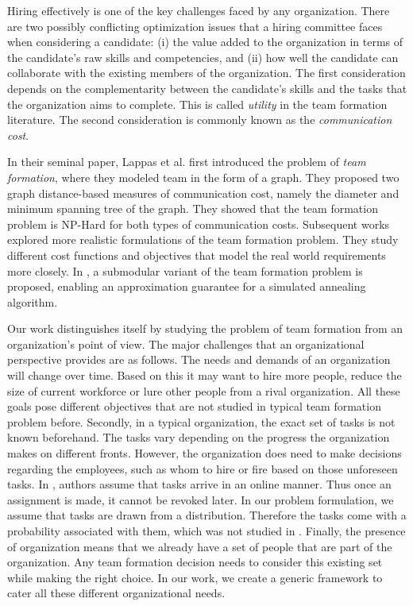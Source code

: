 Hiring effectively is one of the key challenges faced by any organization.
There are two possibly conflicting optimization issues that a hiring committee faces when considering a candidate: 
(i) the value added to the organization in terms of the candidate's raw skills and competencies, and 
(ii) how well the candidate can collaborate with the existing members of the organization.
The first consideration depends on the complementarity between the candidate's skills and the tasks that the organization aims to complete. 
This is called \textit{utility} in the team formation literature.
The second consideration is commonly known as the \textit{communication cost}.

In their seminal paper, Lappas et al. \cite{lappas2009finding} first introduced the problem of \textit{team formation}, where they modeled team in the form of a graph.
They proposed two graph distance-based measures of communication cost, namely the diameter and minimum spanning tree of the graph. 
They showed that the team formation problem is NP-Hard for both types of communication costs. 
Subsequent works  \cite{sozio2010community, kargar2011discovering, anagnostopoulos2010power, rangapuram2013towards} explored more realistic formulations of the team formation problem. They study different cost functions and objectives that model the real world requirements more closely.
In \cite{bhowmik2014submodularity}, a submodular variant of the team formation problem is proposed, enabling an approximation guarantee for a simulated annealing algorithm.

Our work distinguishes itself by studying the problem of team formation from an organization's point of view. The major challenges that an organizational perspective provides are as follows. The needs and demands of an organization will change over time. Based on this it may want to hire more people, reduce the size of current workforce or lure other people from a rival organization. All these goals pose different objectives that are not studied in typical team formation problem before. Secondly, in a typical organization, the exact set of tasks is not known beforehand. The tasks vary depending on the progress the organization makes on different fronts. However, the organization does need to make decisions regarding the employees, such as whom to hire or fire based on those unforeseen tasks. In \cite{anagnostopoulos2012online}, authors assume that tasks arrive in an online manner. Thus once an assignment is made, it cannot be revoked later. In our problem formulation, we assume that tasks are drawn from a distribution. Therefore the tasks come with a probability associated with them, which was not studied in \cite{anagnostopoulos2012online}. Finally, the presence of organization means that we already have a set of people that are part of the organization. Any team formation decision needs to consider this existing set while making the right choice. In our work, we create a generic framework to cater all these different organizational needs.

